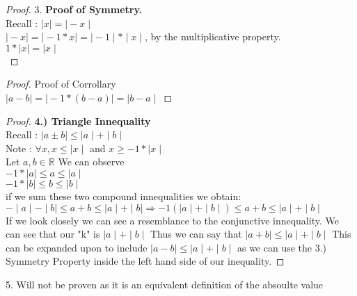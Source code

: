 \documentclass[12pt]{article}
\theoremstyle{definition}
\begin{document}
\begin{proof}
  3. \textbf{Proof of Symmetry.}\\
Recall : $\mid x \mid = \mid -x \mid$ \\
$\mid -x \mid = \mid -1 * x \mid = \mid -1 \mid * \mid x \mid $, by the multiplicative property.\\
$1 * \mid x \mid = \mid x \mid $\\

\end{proof}

\begin{proof}
Proof of Corrollary\\
$\mid a - b \mid = \mid -1 * (b - a) \mid = \mid b - a \mid$


\end{proof}
\begin{proof}
\textbf{4.) Triangle Innequality}\\
Recall : $\mid a \pm b \mid \le \mid a \mid + \mid b \mid$\\
Note : $\forall x, x \le \mid x \mid $ and $ x \ge -1 * \mid x \mid $\\
Let $a,b \in \mathbb{R}$ We can observe \\
$ -1 * \mid a \mid \le a \le \mid a \mid$\\
$ -1 * \mid b \mid \le b \le \mid b \mid$\\
if we sum these two compound innequalities we obtain:\\
$-\mid a \mid - \mid b \mid \le a + b \le \mid a \mid + \mid b \mid \Rightarrow -1(\mid a \mid + \mid b \mid) \le a + b \le \mid a \mid + \mid b \mid$\\
If we look closely we can see a resemblance to the conjunctive innequality. We can see that our "k" is $\mid a \mid + \mid b \mid $
Thus we can say that $\mid a + b \mid \le \mid a \mid + \mid b \mid $ This can be expanded upon to include $\mid a - b \mid \le \mid a \mid + \mid b \mid $ as we can use the 3.) Symmetry Property inside the left hand side of our inequality.

\end{proof}


5. Will not be proven as it is an equivalent definition of the absoulte value\\
\end{document}
